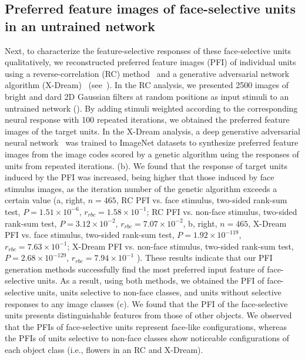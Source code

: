 \documentclass[final,3p,times,twocolumn]{elsarticle}
\begin{document}
\subsection{Preferred feature images of face-selective units in an untrained network}

Next, to characterize the feature-selective responses of these face-selective units qualitatively,
we reconstructed preferred feature images (PFI) of individual units using a reverse-correlation (RC) method~\cite{bonin2011local} and a generative adversarial network algorithm (X-Dream)~\cite{ponce2019evolving} (see~).
In the RC analysis, we presented 2500 images of bright and dard 2D Gaussian filters at random positions as input stimuli to an untrained network ().
By adding stimuli weighted according to the corresponding neural response with 100 repeated iterations, we obtained the preferred feature images of the target units.
In the X-Dream analysis, a deep generative adversarial neural network~\cite{dosovitskiy2016generating} was trained to ImageNet datasets to synthesize preferred feature images from the image codes scored by a genetic algorithm using the responses of units from repeated iterations. (b).
We found that the response of target units induced by the PFI was increased, being higher that those induced by face stimulus images, as the iteration number of the genetic algorithm exceeds a certain value 
(a, right, $ n=465 $, 
RC PFI vs. face stimulus, two-sided rank-sum test, $ P=1.51 \times 10^{-6} $, $ r_{rbc} = 1.58 \times 10^{-1} $;
RC PFI vs. non-face stimulus, two-sided rank-sum test, $ P=3.12 \times 10^{-2} $, $ r_{rbc} = 7.07 \times 10^{-2} $,
b, right, $ n=465 $, 
X-Dream PFI vs. face stimulus, two-sided rank-sum test, $ P=1.92 \times 10^{-119} $, $ r_{rbc} = 7.63 \times 10^{-1} $;
X-Dream PFI vs. non-face stimulus, two-sided rank-sum test, $ P = 2.68 \times 10^{-129} $, $ r_{rbc} = 7.94 \times 10^{-1} $
).
These results indicate that our PFI generation methods successfully find the most preferred input feature of face-selective units.
As a result, using both methods, we obtained the PFI of face-selective units, units selective to non-face classes, and units without selective responses to any image classes (c).
We found that the PFI of the face-selective units presents distinguishable features from those of other objects.
We observed that the PFIs of face-selective units represent face-like configurations, whereas the PFIs of units selective to non-face classes show noticeable configurations of each object class (i.e., flowers in an RC and X-Dream).
\end{document}
